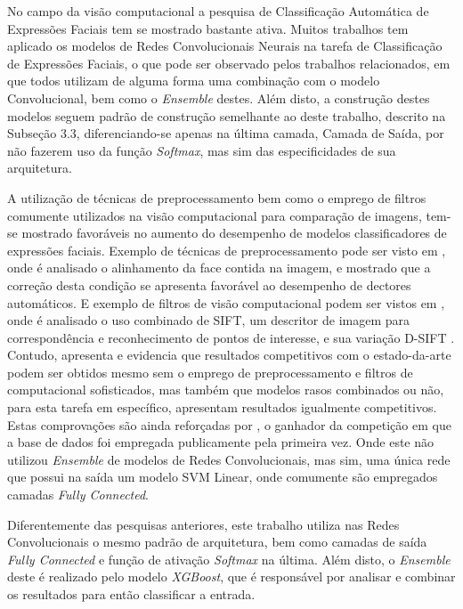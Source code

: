No campo da visão computacional a pesquisa de Classificação Automática de Expressões Faciais tem se mostrado bastante ativa. Muitos trabalhos tem aplicado os modelos de Redes Convolucionais Neurais na tarefa de Classificação de Expressões Faciais, o que pode ser observado pelos trabalhos relacionados, em que todos utilizam de alguma forma uma combinação com o modelo Convolucional, bem como o \textit{Ensemble} destes. Além disto, a construção destes modelos seguem padrão de construção semelhante ao deste trabalho, descrito na Subseção 3.3, diferenciando-se apenas na última camada, Camada de Saída, por não fazerem uso da função \textit{Softmax}, mas sim das especificidades de sua arquitetura.

A utilização de técnicas de preprocessamento bem como o emprego de filtros comumente utilizados na visão computacional para comparação de imagens, tem-se mostrado favoráveis no aumento do desempenho de modelos classificadores de expressões faciais.  Exemplo de técnicas de preprocessamento pode ser visto em \cite{Kim2016FusingAA}, onde é analisado o alinhamento da face contida na imagem, e mostrado que a correção desta condição se apresenta favorável ao desempenho de dectores automáticos.  E exemplo de filtros de visão computacional podem ser vistos em \cite{al2016facial}, onde é analisado o uso combinado de SIFT, um descritor de imagem para correspondência e reconhecimento de pontos de interesse, e sua variação D-SIFT \cite{lindeberg2012scale}. Contudo, \cite{DBLP:journals/corr/PramerdorferK16} apresenta e evidencia que resultados competitivos com o estado-da-arte podem ser obtidos mesmo sem o emprego de preprocessamento e filtros de computacional sofisticados, mas também que modelos rasos combinados ou não, para esta tarefa em específico, apresentam resultados igualmente competitivos. Estas comprovações são ainda reforçadas por \cite{DBLP:journals/corr/Tang13}, o ganhador da competição em que a base de dados foi empregada publicamente pela primeira vez. Onde este não utilizou \textit{Ensemble} de modelos de Redes Convolucionais, mas sim, uma única rede que possui na saída um modelo SVM Linear, onde comumente são empregados camadas \textit{Fully Connected}.

Diferentemente das pesquisas anteriores, este trabalho utiliza nas Redes Convolucionais o mesmo padrão de arquitetura, bem como camadas de saída \textit{Fully Connected} e função de ativação \textit{Softmax} na última. Além disto, o \textit{Ensemble} deste é realizado pelo modelo \textit{XGBoost}, que é responsável por analisar e combinar os resultados para então classificar a entrada.
